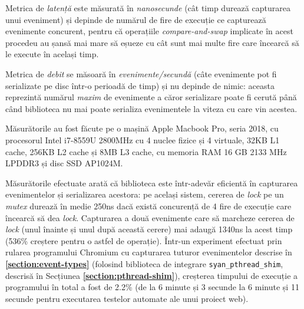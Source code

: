 Metrica de \textit{latență} este măsurată în \textit{nanosecunde} (cât
timp durează capturarea unui eveniment) și depinde de numărul de fire de
execuție ce capturează evenimente concurent, pentru că operațiile
\textit{compare-and-swap} implicate în acest procedeu au șansă mai mare
să eșueze cu cât sunt mai multe fire care încearcă să le execute în
același timp.

Metrica de \textit{debit} se măsoară în \textit{evenimente/secundă}
(câte evenimente pot fi serializate pe disc într-o perioadă de timp) și
nu depinde de nimic: aceasta reprezintă numărul \textit{maxim} de
evenimente a căror serializare poate fi cerută până când biblioteca nu
mai poate serializa evenimentele la viteza cu care vin acestea.

Măsurătorile au fost făcute pe o mașină Apple Macbook Pro, seria 2018,
cu procesorul Intel i7-8559U 2800MHz cu 4 nuclee fizice și 4 virtuale,
32KB L1 cache, 256KB L2 cache și 8MB L3 cache, cu memoria RAM 16 GB
2133 MHz LPDDR3 și disc SSD AP1024M.

Măsurătorile efectuate arată că biblioteca este într-adevăr eficientă în
capturarea evenimentelor și serializarea acestora: pe același sistem,
cererea de \textit{lock} pe un \textit{mutex} durează în medie 250ns
dacă există concurență de 4 fire de execuție care încearcă să dea
\textit{lock}. Capturarea a două evenimente care să marcheze cererea de
\textit{lock} (unul înainte și unul după această cerere) mai adaugă
1340ns la acest timp (536\% creștere pentru o astfel de operație).
Într-un experiment efectuat prin rularea programului
Chromium\cite{chromium} cu capturarea tuturor evenimentelor descrise în
\textbf{\ref{section:event-types}} (folosind biblioteca de integrare
\lstinline{syan_pthread_shim}, descrisă în Secțiunea
\textbf{\ref{section:pthread-shim}}), creșterea timpului de execuție
a programului în total a fost de 2.2\% (de la 6 minute și 3 secunde la 6
minute și 11 secunde pentru executarea testelor automate ale unui
proiect web).
